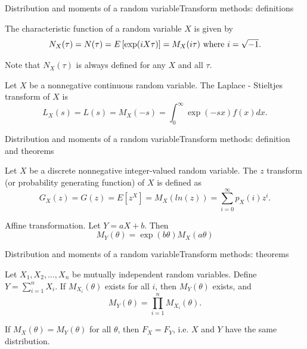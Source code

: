 \documentclass[handout]{beamer}
\begin{document}
\begin{frame}{Distribution and moments of a random variable}{Transform methods: definitions}

\begin{definition}
 The characteristic function of a random variable $X$ is given by
\[
 N_X(\tau) = N(\tau)=E \left[\exp(iX \tau)\right] = M_X(i \tau) \textnormal{ where } i = \sqrt{-1}.
\]
\end{definition}
Note that $N_X(\tau)$ is always defined for any $X$ and all $\tau$.

\begin{definition}
Let $X$ be a nonnegative continuous random variable. The Laplace - Stieltjes transform of $X$ is
\[
 L_X(s) = L(s) = M_X(-s) = \int_0^\infty \exp(-sx) f(x) dx.
\]
\end{definition}

\end{frame}

\begin{frame}{Distribution and moments of a random variable}{Transform methods: definition and theorems}
\begin{definition}
 Let $X$ be a discrete nonnegative integer-valued random variable. The $z$ transform (or probability generating
function) of $X$ is defined as
\[
 G_X(z) = G(z) = E\left[ z^X \right] = M_X(ln(z)) = \sum_{i=0}^{\infty} p_X(i)z^i.
\]
\end{definition}
\begin{Theorem}
Affine transformation. Let $Y=aX + b$. Then
\[
 M_Y(\theta)=\exp(b\theta)M_X(a\theta)
\]
\end{Theorem}
\end{frame}

\begin{frame}{Distribution and moments of a random variable}{Transform methods: theorems}
\begin{Theorem}
Let $X_1, X_2, ...,X_n$ be mutually independent random 
variables. Define $Y=\sum_{i=1}^n X_i$. If $M_{X_i}(\theta)$ exists for all $i$, 
then $M_Y(\theta)$ exists, and
\[
 M_Y(\theta)=\prod _{i=1}^n M_{X_i}(\theta).
\]
\end{Theorem}
\begin{Theorem}
If $M_X(\theta)=M_Y(\theta)$ for all $\theta$, then $F_X=F_Y$, i.e.
$X$ and $Y$ have the same distribution.
\end{Theorem}
\end{frame}
\end{document}
